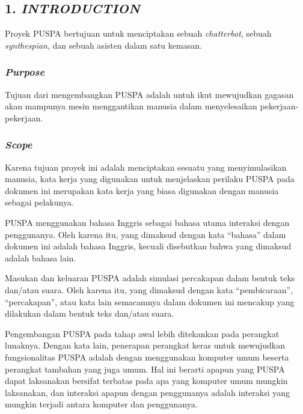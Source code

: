 \subsection*{\textcolor{subsectioncolor}{\textsf{1. \textit{INTRODUCTION}}}}

Proyek PUSPA bertujuan untuk menciptakan sebuah \textit{chatterbot}, sebuah \textit{synthespian}, dan sebuah asisten dalam satu kemasan.


\subsubsection*{\textit{Purpose}}

Tujuan dari mengembangkan PUSPA adalah untuk ikut mewujudkan gagasan akan mampunya mesin menggantikan manusia dalam menyelesaikan pekerjaan-pekerjaan.


\subsubsection*{\textit{Scope}}

Karena tujuan proyek ini adalah menciptakan sesuatu yang menyimulasikan manusia, kata kerja yang digunakan untuk menjelaskan perilaku PUSPA pada dokumen ini merupakan kata kerja yang biasa digunakan dengan manusia sebagai pelakunya.

PUSPA menggunakan bahasa Inggris sebagai bahasa utama interaksi dengan penggunanya.
Oleh karena itu, yang dimaksud dengan kata ``bahasa'' dalam dokumen ini adalah bahasa Inggris, kecuali disebutkan bahwa yang dimaksud adalah bahasa lain.

Masukan dan keluaran PUSPA adalah simulasi percakapan dalam bentuk teks dan/atau suara.
Oleh karena itu, yang dimaksud dengan kata ``pembicaraan'', ``percakapan'', atau kata lain semacamnya dalam dokumen ini mencakup yang dilakukan dalam bentuk teks dan/atau suara.

Pengembangan PUSPA pada tahap awal lebih ditekankan pada perangkat lunaknya.
Dengan kata lain, penerapan perangkat keras untuk mewujudkan fungsionalitas PUSPA adalah dengan menggunakan komputer umum beserta perangkat tambahan yang juga umum.
Hal ini berarti apapun yang PUSPA dapat laksanakan bersifat terbatas pada apa yang komputer umum mungkin laksanakan, dan interaksi apapun dengan penggunanya adalah interaksi yang mungkin terjadi antara komputer dan penggunanya.



